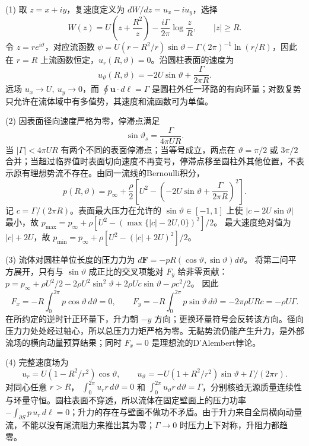 (1) 取 \(z=x+iy\)，复速度定义为 \(dW/dz=u_x-i u_y\)，选择
\[
W(z)=U\left(z+\frac{R^2}{z}\right)-\frac{i\Gamma}{2\pi}\log\frac zR,\qquad |z|\ge R.
\]
令 \(z=re^{i\vartheta}\)，对应流函数
\(\psi=U(r-R^2/r)\sin\vartheta-\Gamma(2\pi)^{-1}\ln(r/R)\)，因此在 \(r=R\) 上流函数恒定，\(u_r(R,\vartheta)=0\)。沿圆柱表面的速度为
\[
u_\vartheta(R,\vartheta)=-2U\sin\vartheta+\frac{\Gamma}{2\pi R}.
\]
远场 \(u_x\to U,\ u_y\to0\)，而
\(\oint\mathbf u\cdot d\boldsymbol\ell=\Gamma\) 是圆柱外任一环路的有向环量；对数复势只允许在流体域中有多值势，其速度和流函数可为单值。

(2) 因表面径向速度严格为零，停滞点满足
\[
\sin\vartheta_s=\frac{\Gamma}{4\pi UR}.
\]
当 \(|\Gamma|<4\pi UR\) 有两个不同的表面停滞点；当等号成立，两点在 \(\vartheta=\pi/2\) 或 \(3\pi/2\) 合并；当超过临界值时表面切向速度不再变号，停滞点移至圆柱外其他位置，不表示原有理想势流不存在。由同一流线的Bernoulli积分，
\[
p(R,\vartheta)=p_\infty+\frac{\rho}{2}
\left[U^2-\left(-2U\sin\vartheta+\frac{\Gamma}{2\pi R}\right)^2\right].
\]
记 \(c=\Gamma/(2\pi R)\)。表面最大压力在允许的 \(\sin\vartheta\in[-1,1]\) 上使 \(|c-2U\sin\vartheta|\) 最小，故
\(p_{\max}=p_\infty+\rho[U^2-(\max\{|c|-2U,0\})^2]/2\)。
最大速度绝对值为 \(|c|+2U\)，故
\(p_{\min}=p_\infty+\rho[U^2-(|c|+2U)^2]/2\)。

(3) 流体对圆柱单位长度的压力力为
\(d\mathbf F=-pR(\cos\vartheta,\sin\vartheta)d\vartheta\)。
将第二问平方展开，只有与 \(\sin\vartheta\) 成正比的交叉项能对 \(F_y\) 给非零贡献：
\(p=p_\infty+\rho U^2/2-2\rho U^2\sin^2\vartheta+2\rho Uc\sin\vartheta-\rho c^2/2\)。
因此
\[
F_x=-R\int_0^{2\pi}p\cos\vartheta\,d\vartheta=0,\qquad
F_y=-R\int_0^{2\pi}p\sin\vartheta\,d\vartheta=-2\pi\rho URc=-\rho U\Gamma.
\]
在所约定的逆时针正环量下，升力朝 \(-y\) 方向；更换环量符号会反转该方向。径向压力力处处经过轴心，所以总压力力矩严格为零。无黏势流仍能产生升力，是外部流场的横向动量预算结果；同时 \(F_x=0\) 是理想流的D'Alembert悖论。

(4) 完整速度场为
\[
u_r=U(1-R^2/r^2)\cos\vartheta,\qquad
u_\vartheta=-U(1+R^2/r^2)\sin\vartheta+\Gamma/(2\pi r).
\]
对同心任意 \(r>R\)，
\(\int_0^{2\pi}u_r r\,d\vartheta=0\) 和
\(\int_0^{2\pi}u_\vartheta r\,d\vartheta=\Gamma\)，分别核验无源质量连续性与环量守恒。圆柱表面不穿透，所以流体在固定壁面上的压力功率
\(-\int_{\partial S}p\,u_r\,d\ell=0\)；升力的存在与壁面不做功不矛盾。由于升力来自全局横向动量流，不能以没有尾流阻力来推出其为零；\(\Gamma\to0\) 时压力上下对称，升阻力都趋零。
